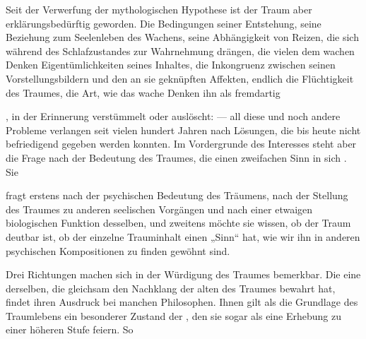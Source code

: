 \documentclass{article}
\begin{document}
            
        \pstart
        Seit der Verwerfung der mythologischen Hypothese ist der
               Traum aber erklärungsbedürftig geworden. Die Bedingungen
               seiner Entstehung, seine Beziehung zum Seelenleben des Wachens, seine Abhängigkeit von Reizen, die sich während des Schlafzustandes zur Wahrnehmung drängen, die vielen dem wachen Denken 
     Eigentümlichkeiten seines Inhaltes, die Inkongruenz zwischen seinen
               Vorstellungsbildern und den an sie geknüpften
               Affekten, endlich die Flüchtigkeit des Traumes, die Art,
               wie das wache Denken ihn als fremdartig 
    
               
    , in der Erinnerung verstümmelt oder auslöscht:
               — all diese und noch andere Probleme verlangen seit vielen hundert
               Jahren nach Lösungen, die bis heute nicht befriedigend gegeben werden konnten.
               Im Vordergrunde des Interesses steht aber die Frage nach der Bedeutung des Traumes, die einen zweifachen Sinn
               in sich 
    . Sie
        \pend
    
         
            
            
            
        \pstart
        fragt erstens nach der psychischen Bedeutung des Träumens, nach der
               Stellung des Traumes zu anderen seelischen Vorgängen
               und nach einer etwaigen biologischen Funktion desselben, und zweitens
               möchte sie wissen, ob der Traum deutbar ist, ob der einzelne
               Trauminhalt einen „Sinn“
               hat, wie wir ihn in anderen psychischen Kompositionen zu finden gewöhnt
               sind.
        \pend
    
            
        \pstart
        Drei Richtungen machen sich in der Würdigung des Traumes bemerkbar. Die eine derselben, die gleichsam den Nachklang
               der alten 
     des Traumes bewahrt hat, findet ihren Ausdruck bei manchen
               Philosophen. Ihnen gilt als die Grundlage des Traumlebens ein besonderer Zustand
               der 
    , den sie sogar als eine Erhebung zu einer höheren Stufe feiern. So 
    
\end{document}
